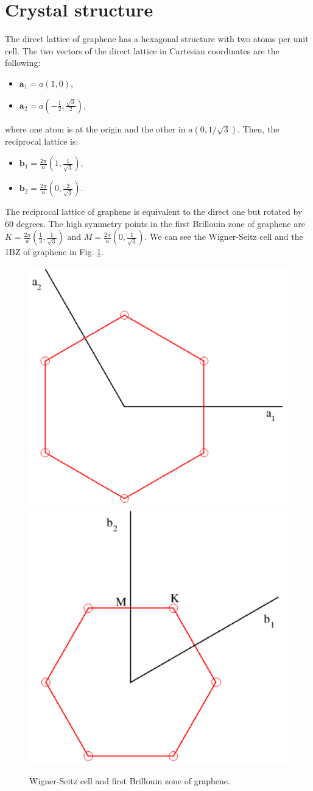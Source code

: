 \section{Crystal structure}

The direct lattice of graphene has a hexagonal structure with two atoms per unit cell. The two vectors of the direct 
lattice in Cartesian coordinates are the following:
\begin{itemize}
 \item $\mathbf{a}_{1}=a(1,0)$,
 \item $\mathbf{a}_{2}=a\left(-\frac{1}{2},\frac{\sqrt{3}}{2}\right)$,
\end{itemize}
where one atom is at the origin and the other in $a(0,1/\sqrt{3})$. Then, the reciprocal lattice is:
\begin{itemize}
 \item $\mathbf{b}_{1}=\frac{2\pi}{a}\left(1,\frac{1}{\sqrt{3}}\right)$,
 \item $\mathbf{b}_{2}=\frac{2\pi}{a}\left(0,\frac{2}{\sqrt{3}}\right)$.
\end{itemize}
The reciprocal lattice of graphene is equivalent to the direct one but rotated by $60$ degrees. The high symmetry 
points in the first Brillouin zone of graphene are $K=\frac{2\pi}{a}\left(\frac{1}{3},\frac{1}{\sqrt{3}}\right)$ and 
$M=\frac{2\pi}{a}\left(0,\frac{1}{\sqrt{3}}\right)$. We can see the Wigner-Seitz cell and the 1BZ of graphene in 
Fig. \ref{wigner}.
\begin{figure}[htb]
\includegraphics[width=0.45\linewidth]{Figures/ws.pdf}
\includegraphics[width=0.45\linewidth]{Figures/brillouin.pdf}
\caption{Wigner-Seitz cell and first Brillouin zone of graphene.}
\label{wigner}
\end{figure}

